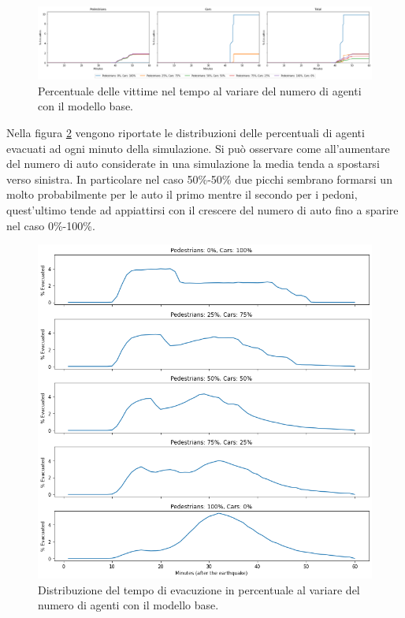 \begin{figure}[h]
    \centering
    \includegraphics[width=\textwidth]{images/analisi/base-casualties.png}
    \caption{Percentuale delle vittime nel tempo al variare del numero di agenti con il modello base.}
    \label{fig:analisi-base-casualties}
\end{figure}

Nella figura \ref{fig:analisi-base-evtimes} vengono riportate le distribuzioni delle percentuali di agenti evacuati ad ogni minuto della simulazione.
%
Si può osservare come all'aumentare del numero di auto considerate in una simulazione la media tenda a spostarsi verso sinistra.
In particolare nel caso 50\%-50\% due picchi sembrano formarsi un molto probabilmente per le auto 
il primo mentre il secondo per i pedoni, quest'ultimo tende ad appiattirsi con il crescere del 
numero di auto fino a sparire nel caso 0\%-100\%.

\begin{figure}
    \centering
    \includegraphics[width=\textwidth]{images/analisi/base-evtimes.png}
    \caption{Distribuzione del tempo di evacuzione in percentuale al variare del numero di agenti con il modello base.}
    \label{fig:analisi-base-evtimes}
\end{figure}

